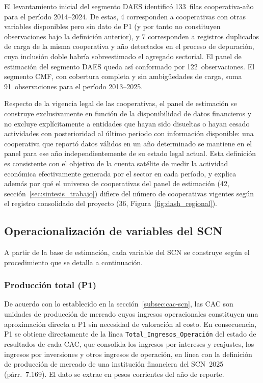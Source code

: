 El levantamiento inicial del segmento DAES identificó
133~filas cooperativa-año para el período 2014--2024. De
estas, 4 corresponden a cooperativas con otras variables
disponibles pero sin dato de P1 (y por tanto no constituyen
observaciones bajo la definición anterior), y 7 corresponden
a registros duplicados de carga de la misma cooperativa y año
detectados en el proceso de depuración, cuya inclusión doble
habría sobreestimado el agregado sectorial. El panel de
estimación del segmento DAES queda así conformado por
122~observaciones. El segmento CMF, con cobertura completa y
sin ambigüedades de carga, suma 91~observaciones para el
período 2013--2025.

Respecto de la vigencia legal de las cooperativas, el panel
de estimación se construye exclusivamente en función de la
disponibilidad de datos financieros y no excluye
explícitamente a entidades que hayan sido disueltas o hayan
cesado actividades con posterioridad al último período con
información disponible: una cooperativa que reportó datos
válidos en un año determinado se mantiene en el panel para
ese año independientemente de su estado legal actual. Esta
definición es consistente con el objetivo de la cuenta
satélite de medir la actividad económica efectivamente
generada por el sector en cada período, y explica además por
qué el universo de cooperativas del panel de estimación
(42, sección~\ref{sec:sintesis_trabajo}) difiere del número de cooperativas
vigentes según el registro consolidado del proyecto
(36, Figura~\ref{fig:dash_regional}).
\newpage
\subsection{Operacionalización de variables del SCN}
\label{subsec:operacionalizacion-variables}

A partir de la base de estimación, cada variable del SCN se
construye según el procedimiento que se detalla a
continuación.

\subsubsection*{Producción total (P1)}

De acuerdo con lo establecido en la sección~\ref{subsec:cac-scn}, las CAC 
son unidades de producción de mercado cuyos ingresos operacionales constituyen 
una aproximación directa a P1 sin necesidad de valoración al costo. En 
consecuencia, P1 se obtiene directamente de la línea 
\texttt{Total\_Ingresos\_Operación} del estado de resultados de cada CAC, 
que consolida los ingresos por intereses y reajustes, los ingresos por 
inversiones y otros ingresos de operación, en línea con la definición de 
producción de mercado de una institución financiera del SCN~2025 
(párr.~7.169). El dato se extrae en pesos corrientes del año de reporte.

